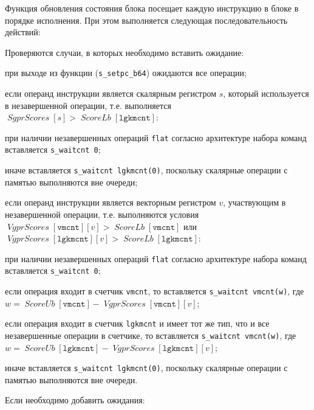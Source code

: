 \documentclass[a4paper,14pt]{extarticle}
\newcommand{\var}[1]{\mathop{\mathit{#1}}}
\begin{document}
{Функция обновления состояния блока посещает каждую инструкцию в блоке в порядке
исполнения. При этом выполняется следующая последовательность действий:
\begin{ol}
\item Проверяются случаи, в которых необходимо вставить ожидание:
  \begin{ol}
  \item при выходе из функции (\verb|s_setpc_b64|) ожидаются все операции;
  \item если операнд инструкции является скалярным регистром $s$, который используется в
    незавершенной операции, т.е. выполняется $\var{SgprScores}[s] > \var{ScoreLb}[\mathtt{lgkmcnt}]$:
    \begin{ul}
    \item при наличии незавершенных операций \verb|flat| согласно архитектуре набора
      команд \cite[глава~9.2.2]{vega-isa} вставляется \verb|s_waitcnt 0|;
    \item иначе вставляется \verb|s_waitcnt lgkmcnt(0)|, поскольку скалярные операции с памятью
      выполняются вне очереди;
    \end{ul}
  \item если операнд инструкции является векторным регистром $v$, участвующим
    в незавершенной операции, т.е. выполняются условия 
    $\var{VgprScores}[\mathtt{vmcnt}][v]>\var{ScoreLb}[\mathtt{vmcnt}]$ или
    $\var{VgprScores}[\mathtt{lgkmcnt}][v]>\var{ScoreLb}[\mathtt{lgkmcnt}]$:
    \begin{ul}
    \item при наличии незавершенных операций \verb|flat| согласно архитектуре набора
      команд вставляется \verb|s_waitcnt 0|;
    \item если операция входит в счетчик \verb|vmcnt|, то вставляется \verb|s_waitcnt vmcnt(w)|,
      где $w = \var{ScoreUb}[\mathtt{vmcnt}] - \var{VgprScores}[\mathtt{vmcnt}][v]$;
    \item если операция входит в счетчик \verb|lgkmcnt| и имеет тот же тип, что и все
      незавершенные операции в счетчике, то вставляется \verb|s_waitcnt vmcnt(w)|,
      где $w = \var{ScoreUb}[\mathtt{lgkmcnt}] - \var{VgprScores}[\mathtt{lgkmcnt}][v]$;
    \item иначе вставляется \verb|s_waitcnt lgkmcnt(0)|, поскольку скалярные операции с памятью
      выполняются вне очереди.
    \end{ul}
  \end{ol}
\item Если необходимо добавить ожидания:

\end{ol}}
\end{document}
